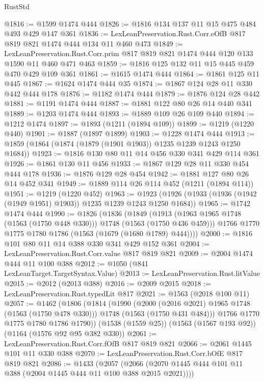 \begin{lexlean}{RustStd}
\begin{coremodule}
{\begin{coremodule}
{{{{{{{{@1816 := @1599 @1474 @444
@1826 := @1816 @134 @137 @11 @15 @475 @484 @493 @429 @147 @361
@1836 := LexLeanPreservation.Rust.Corr.eOfB @817 @819 @821 @1474 @444 @134 @11 @460 @473
@1849 := LexLeanPreservation.Rust.Corr.prim
    @817
    @819
    @821
    @1474
    @444
    @120
    @133
    @1590
    @11
    @460
    @471
    @463
@1859 := @1816 @125 @132 @11 @15 @445 @459 @470 @429 @109 @361
@1861 := @1615 @1474 @444
@1864 := @1861 @125 @11 @445
@1867 := @1624 @1474 @444 @35
@1874 := @1867 @124 @28 @11 @330 @442 @444 @178
@1876 := @1182 @1474 @444
@1879 := @1876 @124 @28 @442
@1881 := @1191 @1474 @444
@1887 := @1881 @122 @80 @26 @14 @440 @341
@1889 := @1203 @1474 @444
@1893 := @1889 @109 @26 @109 @440
@1894 := @1212 @1474
@1897 := @1893 (@1211 (@1894 @109))
@1899 := @1219 (@1220 @440)
@1901 := @1887 (@1897 @1899)
@1903 := @1228 @1474 @444
@1913 := @1859 (@1864 (@1874 (@1879 (@1901 @1903)) @1235 @1239 @1243 @1250 @1684))
@1923 := @1816 @130 @80 @11 @14 @456 @330 @341 @429 @114 @361
@1926 := @1861 @130 @11 @456
@1933 := @1867 @129 @28 @11 @330 @454 @444 @178
@1936 := @1876 @129 @28 @454
@1942 := @1881 @127 @80 @26 @14 @452 @341
@1949 := @1889 @114 @26 @114 @452 (@1211 (@1894 @114))
@1951 := @1219 (@1220 @452)
@1963 := @1923 (@1926 (@1933 (@1936 (@1942 (@1949 @1951) @1903)) @1235 @1239 @1243 @1250 @1684))
@1965 := @1742 @1474 @444
@1990 := @1826
    (@1836
      (@1849
        (@1913 (@1963 @1965 @1748 (@1563 (@1750 @448 @330))) @1748 (@1563 (@1750 @436 @459)))
        @1766
        @1770
        @1775
        @1780
        @1786
        (@1563 (@1679 (@1680 @1789) @444))))
@2000 := @1816 @101 @80 @11 @14 @388 @330 @341 @429 @152 @361
@2004 := LexLeanPreservation.Rust.Corr.value @817 @819 @821
@2009 := @2004 @1474 @444 @11 @100 @388
@2012 := @1050 (@841 LexLeanTarget.TargetSyntax.Value)
@2013 := LexLeanPreservation.Rust.litValue
@2015 := @2012 (@2013 @388)
@2016 := @2009 @2015
@2018 := LexLeanPreservation.Rust.typedLit @817
@2021 := @1563 (@2018 @100 @11)
@2057 := @1462
    (@1806
      (@1814
        (@1990
          (@2000 (@2016 @2021) @1965 @1748 (@1563 (@1750 @478 @330)))
          @1748
          (@1563 (@1750 @431 @484)))
        @1766
        @1770
        @1775
        @1780
        @1786
        @1790))
    (@1538 (@1559 @25))
    (@1563 (@1567 @193 @92))
    (@1164 (@1576 @92 @95 @382 @330))
@2061 := LexLeanPreservation.Rust.Corr.fOfB @817 @819 @821
@2066 := @2061 @1445 @101 @11 @330 @388
@2070 := LexLeanPreservation.Rust.Corr.bOfE @817 @819 @821
@2086 := @1433
    (@2057 (@2066 (@2070 @1445 @444 @101 @11 @388 (@2004 @1445 @444 @11 @100 @388 @2015 @2021))))
}}}}}}}}
\end{coremodule}}
\end{coremodule}
\end{lexlean}
